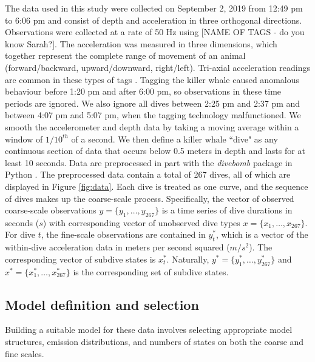 The data used in this study were collected on September 2, 2019 from 12:49 pm to 6:06 pm and consist of depth and acceleration in three orthogonal directions. Observations were collected at a rate of 50 Hz using
[NAME OF TAGS - do you know Sarah?]. The acceleration was measured in three dimensions, which together represent the complete range of movement of an animal (forward/backward, upward/downward, right/left). Tri-axial acceleration readings are common in these types of tags \citep{Cade:2017,Fehlmann:2017,Wright:2017}. Tagging the killer whale caused anomalous behaviour before 1:20 pm and after 6:00 pm, so observations in these time periods are ignored. We also ignore all dives between 2:25 pm and 2:37 pm and between 4:07 pm and 5:07 pm, when the tagging technology malfunctioned. We smooth the accelerometer and depth data by taking a moving average within a window of $1/10^{th}$ of a second. We then define a killer whale ``dive" as any continuous section of data that occurs below 0.5 meters in depth and lasts for at least 10 seconds. Data are preprocessed in part with the \textit{divebomb} package in Python \citep{Nunes:2018}. The preprocessed data contain a total of 267 dives, all of which are displayed in Figure \ref{fig:data}. Each dive is treated as one curve, and the sequence of dives makes up the coarse-scale process. Specifically, the vector of observed coarse-scale observations $y = \Big\{y_1,\ldots,y_{267}\Big\}$ is a time series of dive durations in seconds ($s$) with corresponding vector of unobserved dive types $x = \Big\{x_1,\ldots,x_{267}\Big\}$. For dive $t$, the fine-scale observations are contained in $y^*_{t}$, which is a vector of the within-dive acceleration data in meters per second squared ($m/s^2$). The corresponding vector of subdive states is $x^*_{t}$. Naturally, $y^* = \Big\{y^*_1,\ldots,y^*_{267}\Big\}$ and $x^* = \Big\{x^*_1,\ldots,x^*_{267}\Big\}$ is the corresponding set of subdive states.

\subsection{Model definition and selection}

Building a suitable model for these data involves selecting appropriate model structures, emission distributions, and numbers of states on both the coarse and fine scales. 

